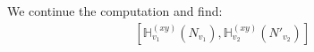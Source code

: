\documentclass[12pt]{article}
\newcommand{\nn}{\nonumber}
\def\e{\epsilon}
\def\cl{{\cal L}}
\begin{document}
\begin{appendix}
We continue the computation and find:
\begin{eqnarray}
\left[\mathds{H}^{(xy)}_{v_1}(N_{v_1}),\mathds{H}^{(xy)}_{v_2}(N'_{v_2})\right] &&\nn\\

\end{eqnarray}
\end{appendix}
\end{document}
